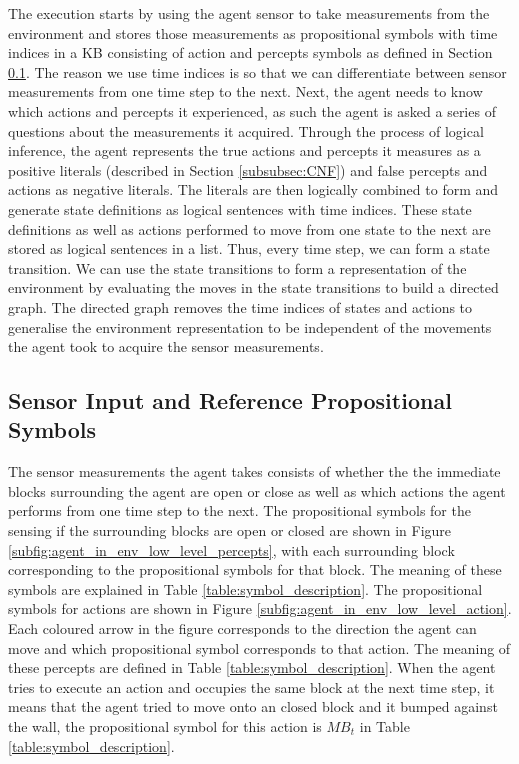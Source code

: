 The execution starts by using the agent sensor to take measurements from the environment and stores those measurements as propositional symbols with time indices in a KB consisting of action and percepts symbols as defined in Section \ref{subsec: sensor_prop_symbols}. The reason we use time indices is so that we can differentiate between sensor measurements from one time step to the next. Next, the agent needs to know which actions and percepts it experienced, as such the agent is asked a series of questions about the measurements it acquired. Through the process of logical inference, the agent represents the true actions and percepts it measures as a positive literals (described in Section \ref{subsubsec:CNF}) and false percepts and actions as negative literals. The literals are then logically combined to form and generate state definitions as logical sentences with time indices. These state definitions as well as actions performed to move from one state to the next are stored as logical sentences in a list. Thus, every time step, we can form a state transition. We can use the state transitions to form a representation of the environment by evaluating the moves in the state transitions to build a directed graph. The directed graph removes the time indices of states and actions to generalise the environment representation to be independent of the movements the agent took to acquire the sensor measurements.


\subsection{Sensor Input and Reference Propositional Symbols}
\label{subsec: sensor_prop_symbols}

The sensor measurements the agent takes consists of whether the the immediate blocks surrounding the agent are open or close as well as which actions the agent performs from one time step to the next. The propositional symbols for the sensing if the surrounding blocks are open or closed are shown in Figure \ref{subfig:agent_in_env_low_level_percepts}, with each surrounding block corresponding to the propositional symbols for that block. The meaning of these symbols are explained in Table \ref{table:symbol_description}. The propositional symbols for actions are shown in  Figure \ref{subfig:agent_in_env_low_level_action}. Each coloured arrow in the figure corresponds to the direction the agent can move and which propositional symbol corresponds to that action. The meaning of these percepts are defined in Table \ref{table:symbol_description}. When the agent tries to execute an action and occupies the same block at the next time step, it means that the agent tried to move onto an closed block and it bumped against the wall, the propositional symbol for this action is $MB_{t}$ in Table \ref{table:symbol_description}.

